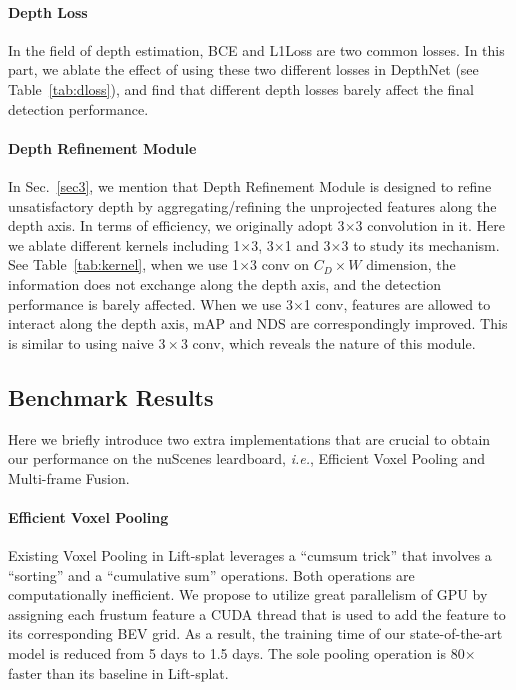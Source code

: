 \documentclass[twocolumn,letterpaper]{article}
\begin{document}
\paragraph{Depth Loss} In the field of depth estimation, BCE and L1Loss are two common losses. In this part, we ablate the effect of using these two different losses in DepthNet (see Table~\ref{tab:dloss}), and find that different depth losses barely affect the final detection performance.

\paragraph{Depth Refinement Module} In Sec.~\ref{sec3}, we mention that Depth Refinement Module is designed to refine unsatisfactory depth by aggregating/refining the unprojected features along the depth axis. In terms of efficiency, we originally adopt 3$\times$3 convolution in it. Here we ablate different kernels including 1$\times$3, 3$\times$1 and 3$\times$3 to study its mechanism. See Table~\ref{tab:kernel}, when we use 1$\times$3 conv on $C_D \times W$ dimension, the information does not exchange along the depth axis, and the detection performance is barely affected. When we use 3$\times$1 conv, features are allowed to interact along the depth axis, mAP and NDS are correspondingly improved. This is similar to using naive $3\times 3$ conv, which reveals the nature of this module.


\subsection{Benchmark Results}

Here we briefly introduce two extra implementations that are crucial to obtain our performance on the nuScenes leardboard, \emph{i.e.}, Efficient Voxel Pooling and Multi-frame Fusion.

\paragraph{Efficient Voxel Pooling} Existing Voxel Pooling in Lift-splat leverages a ``cumsum trick'' that involves a ``sorting'' and a ``cumulative sum'' operations. Both operations are computationally inefficient. We propose to utilize great parallelism of GPU by assigning each frustum feature a CUDA thread that is used to add the feature to its corresponding BEV grid. As a result, the training time of our state-of-the-art model is reduced from 5 days to 1.5 days. The sole pooling operation is 80$\times$ faster than its baseline in Lift-splat.
\end{document}
